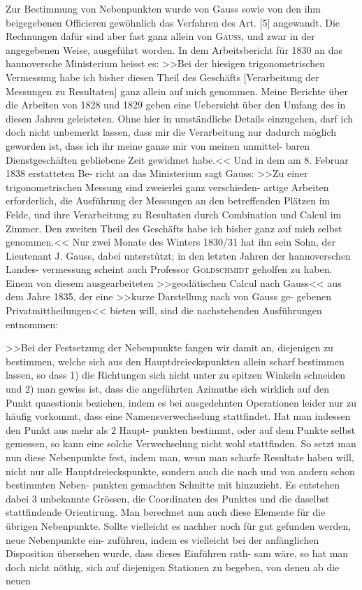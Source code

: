 \documentclass[12pt,a4paper]{article}
\theoremstyle{plain}
\theoremstyle{definition}
\theoremstyle{remark}
\begin{document}
Zur Bestimmung von Nebenpunkten wurde von Gauss sowie von den ihm beigegebenen Officieren
gew\"ohnlich das Verfahren des Art. [5] angewandt. Die Rechnungen daf\"ur sind aber fast ganz allein von
\textsc{Gauss}, und zwar in der angegebenen Weise, ausgef\"uhrt worden. In dem Arbeitsbericht f\"ur 1830 an das
hannoversche Ministerium heisst es: >>Bei der hiesigen trigonometrischen Vermessung habe ich bisher diesen
Theil des Gesch\"afts [Verarbeitung der Messungen zu Resultaten] ganz allein auf mich genommen. Meine
Berichte \"uber die Arbeiten von 1828 und 1829 geben eine Uebersicht \"uber den Umfang des in diesen Jahren
geleisteten. Ohne hier in umst\"andliche Details einzugehen, darf ich doch nicht unbemerkt lassen, dass mir
die Verarbeitung nur dadurch m\"oglich geworden ist, dass ich ihr meine ganze mir von meinen unmittel-
baren Dienstgesch\"aften gebliebene Zeit gewidmet habe.<< Und in dem am 8. Februar 1838 erstatteten Be-
richt an das Ministerium sagt Gauss: >>Zu einer trigonometrischen Messung sind zweierlei ganz verschieden-
artige Arbeiten erforderlich, die Ausf\"uhrung der Messungen an den betreffenden Pl\"atzen im Felde, und ihre
Verarbeitung zu Resultaten durch Combination und Calcul im Zimmer. Den zweiten Theil des Gesch\"afts
habe ich bisher ganz auf mich selbst genommen.<< Nur zwei Monate des Winters 1830/31 hat ihn sein
Sohn, der Lieutenant J. Gauss, dabei unterst\"utzt; in den letzten Jahren der hannoverschen Landes-
vermessung scheint auch Professor \textsc{Goldschmidt} geholfen zu haben. Einem von diesem ausgearbeiteten
>>geod\"atischen Calcul nach Gauss<< aus dem Jahre 1835, der eine >>kurze Darstellung nach von Gauss ge-
gebenen Privatmittheilungen<< bieten will, sind die nachstehenden Ausf\"uhrungen entnommen:

>>Bei der Festsetzung der Nebenpunkte fangen wir damit an, diejenigen zu bestimmen, welche
sich aus den Hauptdreieckspunkten allein scharf bestimmen lassen, so dass 1) die Richtungen sich
nicht unter zu spitzen Winkeln schneiden und 2) man gewiss ist, dass die angef\"uhrten Azimuthe sich
wirklich auf den Punkt quaestionis beziehen, indem es bei ausgedehnten Operationen leider nur zu h\"aufig
vorkommt, dass eine Namensverwechselung stattfindet. Hat man indessen den Punkt aus mehr als 2 Haupt-
punkten bestimmt, oder auf dem Punkte selbst gemessen, so kann eine solche Verwechselung nicht wohl
stattfinden. So setzt man nun diese Nebenpunkte fest, indem man, wenn man scharfe Resultate haben
will, nicht nur alle Hauptdreieckspunkte, sondern auch die nach und von andern schon bestimmten Neben-
punkten gemachten Schnitte mit hinzuzieht. Es entstehen dabei 3 unbekannte Gr\"ossen, die Coordinaten des
Punktes und die daselbst stattfindende Orientirung. Man berechnet nun auch diese Elemente f\"ur die
\"ubrigen Nebenpunkte. Sollte vielleicht es nachher noch f\"ur gut gefunden werden, neue Nebenpunkte ein-
zuf\"uhren, indem es vielleicht bei der anf\"anglichen Disposition \"ubersehen wurde, dass dieses Einf\"uhren rath-
sam w\"are, so hat man doch nicht n\"othig, sich auf diejenigen Stationen zu begeben, von denen ab die neuen
\end{document}
